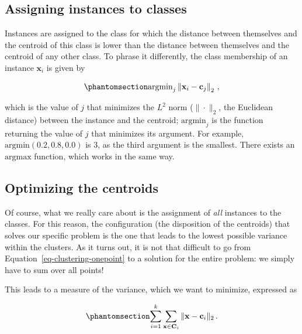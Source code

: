 \documentclass[
  letterpaper,
]{scrbook}
\begin{document}
\subsection{Assigning instances to
classes}\label{assigning-instances-to-classes}


Instances are assigned to the class for which the distance between
themselves and the centroid of this class is lower than the distance
between themselves and the centroid of any other class. To phrase it
differently, the class membership of an instance \(\mathbf{x}_i\) is
given by

\begin{equation}\phantomsection\label{eq-clustering-onepoint}{
\text{argmin}_j \left\|\mathbf{x}_i-\mathbf{c}_j\right\|_2 \,,
}\end{equation}

which is the value of \(j\) that minimizes the \(L^2\) norm
(\(\|\cdot\|_2\), the Euclidean distance) between the instance and the
centroid; \(\text{argmin}_j\) is the function returning the value of
\(j\) that minimizes its argument. For example,
\(\text{argmin}(0.2,0.8,0.0)\) is \(3\), as the third argument is the
smallest. There exists an \(\text{argmax}\) function, which works in the
same way.

\subsection{Optimizing the centroids}\label{optimizing-the-centroids}

Of course, what we really care about is the assignment of \emph{all}
instances to the classes. For this reason, the configuration (the
disposition of the centroids) that solves our specific problem is the
one that leads to the lowest possible variance within the clusters. As
it turns out, it is not that difficult to go from
Equation~\ref{eq-clustering-onepoint} to a solution for the entire
problem: we simply have to sum over all points!

This leads to a measure of the variance, which we want to minimize,
expressed as

\begin{equation}\phantomsection\label{eq-clustering-variance}{
\sum_{i=1}^k \sum_{\mathbf{x}\in \mathbf{C}_i} \|\mathbf{x} - \mathbf{c}_i\|_2 \,.
}\end{equation}
\end{document}
